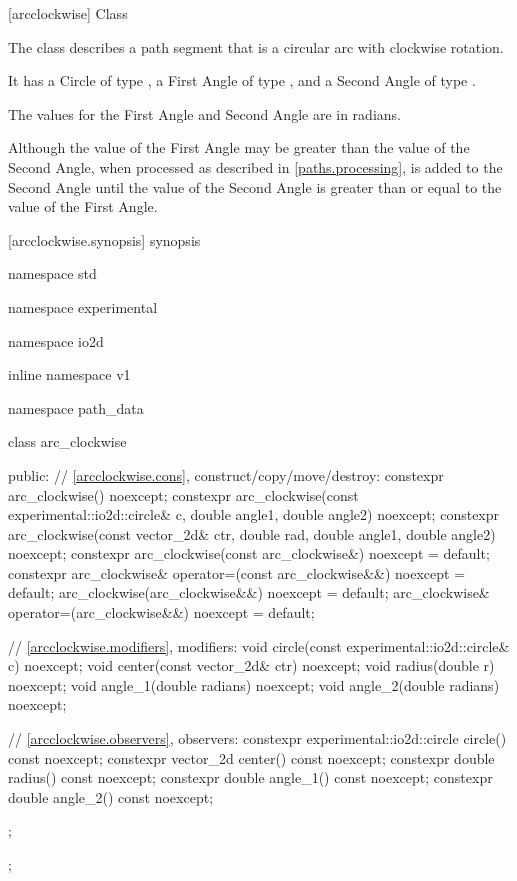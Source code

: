  [arcclockwise] {Class }

\pnum
{}
The class  describes a path segment that is a circular arc with clockwise rotation.

\pnum
It has a Circle of type , a First Angle of type , and a Second Angle of type .

\pnum
The values for the First Angle and Second Angle are in radians.

\pnum
\enternote
Although the value of the First Angle may be greater than the value of the Second Angle, when processed as described in \ref{paths.processing},  is added to the Second Angle until the value of the Second Angle is greater than or equal to the value of the First Angle.
\exitnote

 [arcclockwise.synopsis] { synopsis}

\begin{codeblock}
namespace std { namespace experimental { namespace io2d { inline namespace v1 {
  namespace path_data {
    class arc_clockwise {
    public:
      // \ref{arcclockwise.cons}, construct/copy/move/destroy:
      constexpr arc_clockwise() noexcept;
      constexpr arc_clockwise(const experimental::io2d::circle& c,
        double angle1, double angle2) noexcept;
      constexpr arc_clockwise(const vector_2d& ctr, double rad,
        double angle1, double angle2) noexcept;
      constexpr arc_clockwise(const arc_clockwise&) noexcept = default;
      constexpr arc_clockwise& operator=(const arc_clockwise&&)
        noexcept = default;
      arc_clockwise(arc_clockwise&&) noexcept = default;
      arc_clockwise& operator=(arc_clockwise&&) noexcept = default;

      // \ref{arcclockwise.modifiers}, modifiers:
      void circle(const experimental::io2d::circle& c) noexcept;
      void center(const vector_2d& ctr) noexcept;
      void radius(double r) noexcept;
      void angle_1(double radians) noexcept;
      void angle_2(double radians) noexcept;

      // \ref{arcclockwise.observers}, observers:
      constexpr experimental::io2d::circle circle() const noexcept;
      constexpr vector_2d center() const noexcept;
      constexpr double radius() const noexcept;
      constexpr double angle_1() const noexcept;
      constexpr double angle_2() const noexcept;
    };
  };
} } } }
\end{codeblock}

